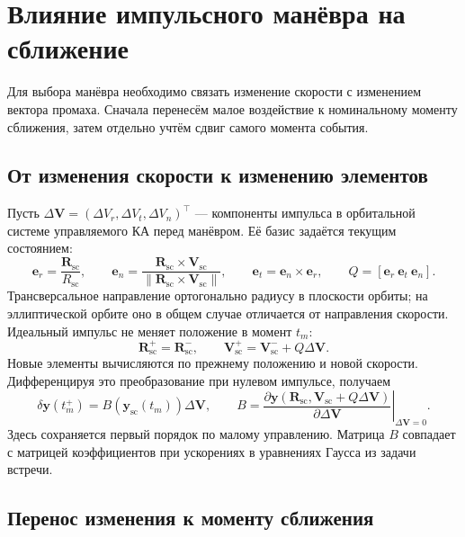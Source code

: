 \documentclass[a4paper,11pt]{article}
\newcommand{\vect}[1]{\boldsymbol{#1}}
\newcommand{\norm}[1]{\left\lVert#1\right\rVert}
\numberwithin{equation}{section}
\begin{document}
\section{Влияние импульсного манёвра на сближение}
\label{sec:influence}

Для выбора манёвра необходимо связать изменение скорости
с изменением вектора промаха. Сначала перенесём малое воздействие
к номинальному моменту сближения, затем отдельно учтём сдвиг
самого момента события.

\subsection{От изменения скорости к изменению элементов}

Пусть $\Delta\vect V=(\Delta V_r,\Delta V_t,\Delta V_n)^\top$
--- компоненты импульса в орбитальной системе управляемого КА
перед манёвром. Её базис задаётся текущим состоянием:
\begin{equation}
 \vect e_r=\frac{\vect R_{\mathrm{sc}}}{R_{\mathrm{sc}}},\qquad
 \vect e_n=\frac{\vect R_{\mathrm{sc}}\times\vect V_{\mathrm{sc}}}
 {\norm{\vect R_{\mathrm{sc}}\times\vect V_{\mathrm{sc}}}},\qquad
 \vect e_t=\vect e_n\times\vect e_r,
 \qquad Q=[\vect e_r\ \vect e_t\ \vect e_n].
 \label{eq:rtn-basis}
\end{equation}
Трансверсальное направление ортогонально радиусу в плоскости орбиты;
на эллиптической орбите оно в общем случае отличается от направления
скорости. Идеальный импульс не меняет положение в момент $t_m$:
\begin{equation}
 \vect R_{\mathrm{sc}}^+=\vect R_{\mathrm{sc}}^-,\qquad
 \vect V_{\mathrm{sc}}^+=\vect V_{\mathrm{sc}}^-+Q\Delta\vect V.
 \label{eq:impulse-jump}
\end{equation}
Новые элементы вычисляются по прежнему положению и новой скорости.
Дифференцируя это преобразование при нулевом импульсе, получаем
\begin{equation}
 \delta\vect y(t_m^+)=B(\vect y_{\mathrm{sc}}(t_m))\Delta\vect V,
 \qquad
 B=\left.
 \frac{\partial\vect y(\vect R_{\mathrm{sc}},\vect V_{\mathrm{sc}}+Q\Delta\vect V)}
 {\partial\Delta\vect V}\right|_{\Delta\vect V=0}.
 \label{eq:B-definition}
\end{equation}
Здесь сохраняется первый порядок по малому управлению.
Матрица $B$ совпадает с матрицей коэффициентов при ускорениях
в уравнениях Гаусса из задачи встречи.

\subsection{Перенос изменения к моменту сближения}
\end{document}
